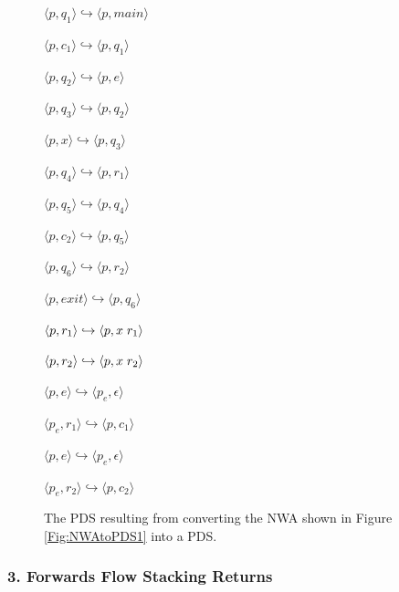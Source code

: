 \begin{figure}[htbp]
  \centering
    \begin{description}
      \centering
      \item $\langle p,q_1 \rangle \hookrightarrow \langle p,main \rangle$
      \item $\langle p,c_1 \rangle \hookrightarrow \langle p,q_1 \rangle$
      \item $\langle p,q_2 \rangle \hookrightarrow \langle p,e \rangle$
      \item $\langle p,q_3 \rangle \hookrightarrow \langle p,q_2 \rangle$
      \item $\langle p,x \rangle \hookrightarrow \langle p,q_3 \rangle$
      \item $\langle p,q_4 \rangle \hookrightarrow \langle p,r_1 \rangle$
      \item $\langle p,q_5 \rangle \hookrightarrow \langle p,q_4 \rangle$
      \item $\langle p,c_2 \rangle \hookrightarrow \langle p,q_5 \rangle$
      \item $\langle p,q_6 \rangle \hookrightarrow \langle p,r_2 \rangle$
      \item $\langle p,exit \rangle \hookrightarrow \langle p,q_6 \rangle$
      \item $\langle p,r_1 \rangle \hookrightarrow \langle p,x \hspace{.1cm} r_1 \rangle$
      \item $\langle p,r_2 \rangle \hookrightarrow \langle p,x \hspace{.1cm} r_2 \rangle$
      \item $\langle p,e \rangle \hookrightarrow \langle p_e, \epsilon \rangle$
      \item $\langle p_e,r_1 \rangle \hookrightarrow \langle p,c_1 \rangle$
      \item $\langle p,e \rangle \hookrightarrow \langle p_e, \epsilon \rangle$
      \item $\langle p_e,r_2 \rangle \hookrightarrow \langle p,c_2 \rangle$
    \end{description}
  \caption{The PDS resulting from converting the NWA shown in Figure \ref{Fig:NWAtoPDS1} into a PDS.}
  \label{Fig:NWAtoPDS5}
\end{figure}

\subsubsection{3. Forwards Flow Stacking Returns}

